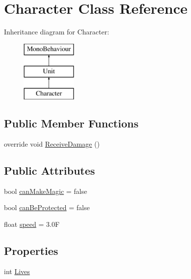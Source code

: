 \hypertarget{class_character}{}\section{Character Class Reference}
\label{class_character}
Inheritance diagram for Character\+:\begin{figure}[H]
\begin{center}
\leavevmode
\includegraphics[height=3.000000cm]{class_character}
\end{center}
\end{figure}
\subsection*{Public Member Functions}
\begin{DoxyCompactItemize}
\item 
override void \mbox{\hyperlink{class_character_a4c92566bccf29f534c3863eb12fddba2}{Receive\+Damage}} ()
\end{DoxyCompactItemize}
\subsection*{Public Attributes}
\begin{DoxyCompactItemize}
\item 
bool \mbox{\hyperlink{class_character_ab0f4a965ac9a929654251db63b51131a}{can\+Make\+Magic}} = false
\item 
bool \mbox{\hyperlink{class_character_a07fd3e211945cdfc6d813127908d48fb}{can\+Be\+Protected}} = false
\item 
float \mbox{\hyperlink{class_character_a34ba4bab0f4e03bc819698826f483572}{speed}} = 3.\+0F
\end{DoxyCompactItemize}
\subsection*{Properties}
\begin{DoxyCompactItemize}
\item 
int \mbox{\hyperlink{class_character_a9aa02060768a4818a7be5439d4b2b34b}{Lives}}
\end{DoxyCompactItemize}
